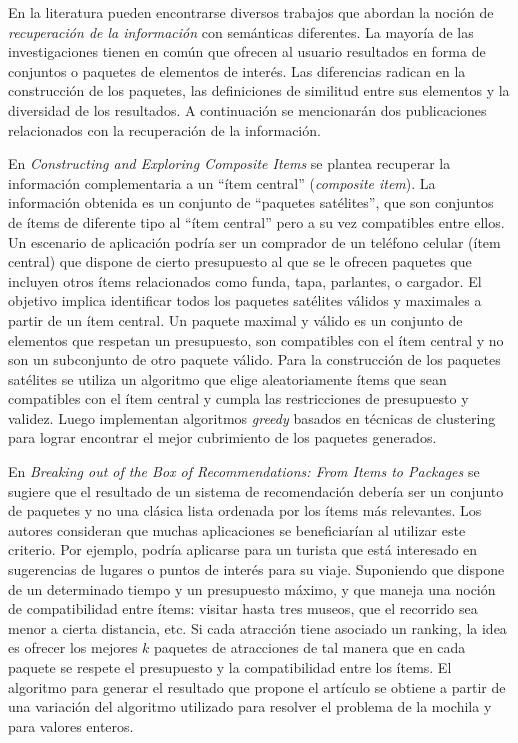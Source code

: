 En la literatura pueden encontrarse diversos trabajos que abordan la noción de \emph{recuperación de la información} con semánticas diferentes. La mayoría de las investigaciones tienen en común que ofrecen al usuario resultados en forma de conjuntos o paquetes de elementos de interés. Las diferencias radican en la construcción de los paquetes, las definiciones de similitud entre sus elementos y la diversidad de los resultados. A continuación se mencionarán dos publicaciones relacionados con la recuperación de la información.

En \textit{Constructing and Exploring Composite Items} \cite{BasuRoy:2010:CEC:1807167.1807258} se plantea recuperar la información complementaria a un ``ítem central'' (\textit{composite item}). La información obtenida es un conjunto de ``paquetes satélites'', que son conjuntos de ítems de diferente tipo al ``ítem central'' pero a su vez compatibles entre ellos. Un escenario de aplicación podría ser un comprador de un teléfono celular (ítem central) que dispone de cierto presupuesto al que se le ofrecen paquetes que incluyen otros ítems relacionados como funda, tapa, parlantes, o cargador. El objetivo implica identificar todos los paquetes satélites válidos y maximales a partir de un ítem central. Un paquete maximal y válido es un conjunto de elementos que respetan un presupuesto, son compatibles con el ítem central y no son un subconjunto de otro paquete válido. Para la construcción de los paquetes satélites se utiliza un algoritmo que elige aleatoriamente ítems que sean compatibles con el ítem central y cumpla las restricciones de presupuesto y validez. Luego implementan algoritmos \emph{greedy} basados en técnicas de clustering para lograr encontrar el mejor cubrimiento de los paquetes generados.

En \textit{Breaking out of the Box of Recommendations: From Items to Packages} \cite{Xie:2010:BOB:1864708.1864739} se sugiere que el resultado de un sistema de recomendación debería ser un conjunto de paquetes y no una clásica lista ordenada por los ítems más relevantes. Los autores consideran que muchas aplicaciones se beneficiarían al utilizar este criterio. Por ejemplo, podría aplicarse para un turista que está interesado en sugerencias de lugares o puntos de interés para su viaje. Suponiendo que dispone de un determinado tiempo y un presupuesto máximo, y que maneja una noción de compatibilidad entre ítems: visitar hasta tres museos, que el recorrido sea menor a cierta distancia, etc. Si cada atracción tiene asociado un ranking, la idea es ofrecer los mejores $k$ paquetes de atracciones de tal manera que en cada paquete se respete el presupuesto y la compatibilidad entre los ítems. El algoritmo para generar el resultado que propone el artículo se obtiene a partir de una variación del algoritmo utilizado para resolver el problema de la mochila \cite{DBLP:conf/coco/Karp72} y \cite{Gossett:2009:DMP:1717238} para valores enteros. 

